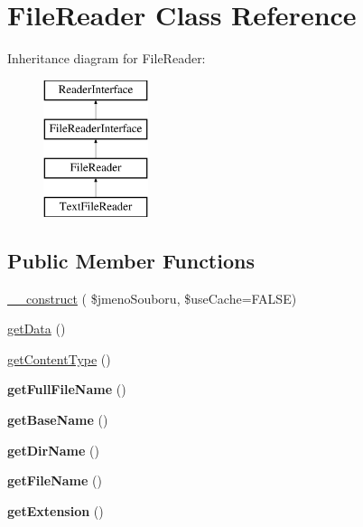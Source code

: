 \hypertarget{class_pes_1_1_readers_1_1_file_reader}{}\section{File\+Reader Class Reference}
\label{class_pes_1_1_readers_1_1_file_reader}
Inheritance diagram for File\+Reader\+:\begin{figure}[H]
\begin{center}
\leavevmode
\includegraphics[height=4.000000cm]{class_pes_1_1_readers_1_1_file_reader}
\end{center}
\end{figure}
\subsection*{Public Member Functions}
\begin{DoxyCompactItemize}
\item 
\mbox{\hyperlink{class_pes_1_1_readers_1_1_file_reader_aac1b9b4103c3753e81a906150e17b242}{\+\_\+\+\_\+construct}} ( \$jmeno\+Souboru, \$use\+Cache=F\+A\+L\+SE)
\item 
\mbox{\hyperlink{class_pes_1_1_readers_1_1_file_reader_a81a67162a6288d78fc4c55283325f0b4}{get\+Data}} ()
\item 
\mbox{\hyperlink{class_pes_1_1_readers_1_1_file_reader_aa843137beb02bc2516fe0551c00ff7d7}{get\+Content\+Type}} ()
\item 
\mbox{\label{class_pes_1_1_readers_1_1_file_reader_a5a9218f1e1a3edae01ec12081b801a30}} 
{\bfseries get\+Full\+File\+Name} ()
\item 
\mbox{\label{class_pes_1_1_readers_1_1_file_reader_ab358af70bc7b8a585d0d3c9962468281}} 
{\bfseries get\+Base\+Name} ()
\item 
\mbox{\label{class_pes_1_1_readers_1_1_file_reader_ad72ee41de5e475eeef1b10a8a5d47b85}} 
{\bfseries get\+Dir\+Name} ()
\item 
\mbox{\label{class_pes_1_1_readers_1_1_file_reader_afdeebfe3fcf5806fc79c074a6a3a6eb1}} 
{\bfseries get\+File\+Name} ()
\item 
\mbox{\label{class_pes_1_1_readers_1_1_file_reader_ae6914d3a98b1490a7da85ffb5e4cb8ab}} 
{\bfseries get\+Extension} ()
\end{DoxyCompactItemize}
